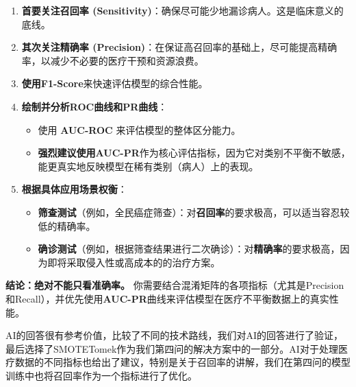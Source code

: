 \documentclass[a4paper, oneside, 12pt]{article}
\newcommand{\aisubsection}[1]{%
    \par\smallskip
    \noindent
    \tcbox[
        on line,
        colback=black!20,
        colframe=black!75,
        fontupper=\bfseries,
        boxsep=2pt,
        left=3pt, right=3pt, top=2pt, bottom=2pt,
        arc=2pt
    ]{#1}
    \par\nopagebreak
}
\begin{document}
\begin{aireport}
{    \begin{enumerate}
        \item \textbf{首要关注召回率 (Sensitivity)}：确保尽可能少地漏诊病人。这是临床意义的底线。
        \item \textbf{其次关注精确率 (Precision)}：在保证高召回率的基础上，尽可能提高精确率，以减少不必要的医疗干预和资源浪费。
        \item \textbf{使用F1-Score}来快速评估模型的综合性能。
        \item \textbf{绘制并分析ROC曲线和PR曲线}：
        \begin{itemize}
            \item 使用 \textbf{AUC-ROC} 来评估模型的整体区分能力。
            \item \textbf{强烈建议使用AUC-PR}作为核心评估指标，因为它对类别不平衡不敏感，能更真实地反映模型在稀有类别（病人）上的表现。
        \end{itemize}
        \item \textbf{根据具体应用场景权衡}：
        \begin{itemize}
            \item \textbf{筛查测试}（例如，全民癌症筛查）：对\textbf{召回率}的要求极高，可以适当容忍较低的精确率。
            \item \textbf{确诊测试}（例如，根据筛查结果进行二次确诊）：对\textbf{精确率}的要求极高，因为即将采取侵入性或高成本的的治疗方案。
        \end{itemize}
    \end{enumerate}

    \textbf{结论：绝对不能只看准确率。} 你需要结合混淆矩阵的各项指标（尤其是Precision和Recall），并优先使用\textbf{AUC-PR}曲线来评估模型在医疗不平衡数据上的真实性能。}

    \aisubsection{采纳和人工修改情况}
    AI的回答很有参考价值，比较了不同的技术路线，我们对AI的回答进行了验证，最后选择了SMOTETomek作为我们第四问的解决方案中的一部分。AI对于处理医疗数据的不同指标也给出了建议，特别是关于召回率的讲解，我们在第四问的模型训练中也将召回率作为一个指标进行了优化。
\end{aireport}
\end{document}
